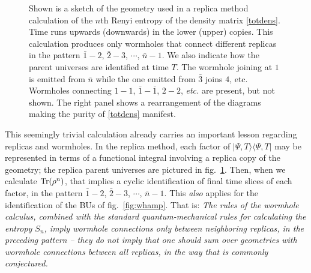 \documentclass[11pt]{article}
\numberwithin{equation}{section}
\newcommand{\Tr}{{\rm Tr}}
\begin{document}
\begin{figure}[h!]
\begin{center}
 \hspace{-0.3cm} 
 \caption{\label{fig:whrep} Shown is a sketch of the geometry used in a replica method calculation of the 
 $n$th Renyi entropy of the  density matrix \eqref{totdens}. Time runs upwards (downwards) in the lower (upper) copies. This calculation produces only wormholes 
  that connect different replicas  in the pattern ${\bar 1}-2$, ${\bar 2}-3$, $\cdots$, ${\bar n} - 1$.  We also indicate how the parent universes  are identified at time $T$. The wormhole joining at $1$ is emitted from $\bar{n}$ while the one emitted from $\bar{3}$ joins $4$, etc. Wormholes connecting $1-1$, $\bar{1}-\bar{1}$, $2-2$, {\it etc.} are present, but not shown. The right panel shows a rearrangement of the diagrams making the purity of \eqref{totdens} manifest. }
\end{center}
\end{figure}

This seemingly trivial calculation already carries an important lesson regarding replicas and wormholes.  In the replica method\cite{CaWi}, each factor of $|\Psi, T\rangle \langle\Psi, T|$ may be represented in terms of a functional integral involving a replica copy of the geometry; the replica parent universes are pictured in fig.~\ref{fig:whrep}.  Then, when we calculate $\Tr (\rho^n)$, that implies a cyclic identification of final time slices of each factor, in the pattern ${\bar 1}-2$, ${\bar 2}-3$, $\cdots$, ${\bar n} - 1$. This {\it also} applies for the identification of the BUs of fig.~\ref{fig:whamp}. That is: {\it The rules of the wormhole calculus, combined with the standard quantum-mechanical rules for calculating the entropy $S_n$, imply wormhole connections only between neighboring replicas, in the preceding pattern -- they do {\rm not} imply that one should sum over geometries with wormhole connections between all replicas, in the way that is commonly conjectured\cite{Penington:2019kki, Almheiri:2019qdq}.}  
\end{document}
